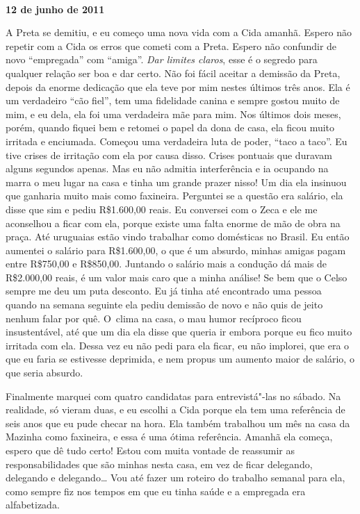 \begin{center}\asterisc{}​\end{center}


\begin{flushright}\textbf{12 de junho de 2011}\end{flushright}


A Preta se demitiu, e eu começo uma nova vida com a Cida amanhã. Espero
não repetir com a Cida os erros que cometi com a Preta. Espero não
confundir de novo ``empregada'' com ``amiga''. \emph{Dar limites
claros}, esse é o segredo para qualquer relação ser boa e dar certo. Não
foi fácil aceitar a demissão da Preta, depois da enorme dedicação que
ela teve por mim nestes últimos três anos. Ela é um verdadeiro ``cão
fiel'', tem uma fidelidade canina e sempre gostou muito de mim, e eu
dela, ela foi uma verdadeira mãe para mim. Nos últimos dois meses,
porém, quando fiquei bem e retomei o papel da dona de casa, ela ficou
muito irritada e enciumada. Começou uma verdadeira luta de poder, ``taco
a taco''. Eu tive crises de irritação com ela por causa disso. Crises
pontuais que duravam alguns segundos apenas. Mas eu não admitia
interferência e ia ocupando na marra o meu lugar na casa e tinha um
grande prazer nisso! Um dia ela insinuou que ganharia muito mais como
faxineira. Perguntei se a questão era salário, ela disse que sim e pediu
R\$1.600,00 reais. Eu conversei com o Zeca e ele me aconselhou a ficar
com ela, porque existe uma falta enorme de mão de obra na praça. Até
uruguaias estão vindo trabalhar como domésticas no Brasil. Eu então
aumentei o salário para R\$1.600,00, o que é um absurdo, minhas amigas
pagam entre R\$750,00 e R\$850,00. Juntando o salário mais a condução dá
mais de R\$2.000,00 reais, é um valor mais caro que a minha análise! Se
bem que o Celso sempre me deu um puta desconto. Eu já tinha até
encontrado uma pessoa quando na semana seguinte ela pediu demissão de
novo e não quis de jeito nenhum falar por quê. O~clima na casa, o mau
humor recíproco ficou insustentável, até que um dia ela disse que queria
ir embora porque eu fico muito irritada com ela. Dessa vez eu não pedi para ela ficar,
eu não implorei, que era o que eu faria se estivesse deprimida, e nem
propus um aumento maior de salário, o que seria absurdo.

Finalmente marquei com quatro candidatas para entrevistá"-las no sábado.
Na realidade, só vieram duas, e eu escolhi a Cida porque ela tem uma
referência de seis anos que eu pude checar na hora. Ela também trabalhou
um mês na casa da Mazinha como faxineira, e essa é uma ótima referência.
Amanhã ela começa, espero que dê tudo certo! Estou com muita vontade de
reassumir as responsabilidades que são minhas nesta casa, em vez de
ficar delegando, delegando e delegando… Vou até fazer um roteiro
do trabalho semanal para ela, como sempre fiz nos tempos em que eu tinha
saúde e a empregada era alfabetizada.

